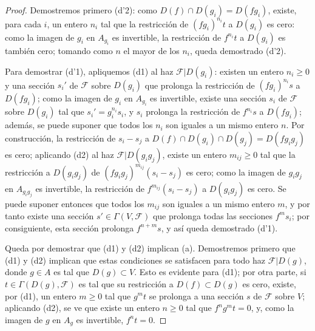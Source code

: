 \documentclass[oneside]{amsart}
\theoremstyle{ega-env-style}
\theoremstyle{ega-thm-env-style}
\theoremstyle{ega-defn-env-style}
\def\geq{\geqslant}                 %
\newcommand{\oldpage}[2][]{{\marginnote{\normalfont{\textbf{#1}~|~#2}}}\ignorespaces}
\begin{document}
\begin{proof}
Demostremos primero (d'2): como $D(f)\cap D(g_i)=D(fg_i)$, existe, para cada $i$, un entero $n_i$ tal que la restricción de $(fg_i)^{n_i}t$ a $D(g_i)$ es cero:
como la imagen de $g_i$ en $A_{g_i}$ es invertible, la restricción de $f^{n_i}t$ a $D(g_i)$ es también cero;
tomando como $n$ el mayor de los $n_i$, queda demostrado (d'2).

Para demostrar (d'1), apliquemos (d1) al haz $\mathscr{F}|D(g_i)$: existen un entero $n_i\geq0$ y una sección $s_i'$ de $\mathscr{F}$ sobre $D(g_i)$ que prolonga la restricción de $(fg_i)^{n_i}s$ a $D(fg_i)$;
como la imagen de $g_i$ en $A_{g_i}$ es invertible, existe una sección $s_i$ de $\mathscr{F}$ sobre $D(g_i)$ tal que $s_i'=g_i^{n_i}s_i$, y $s_i$ prolonga la
restricción de $f^{n_i}s$ a $D(fg_i)$;
además, se puede suponer que todos los $n_i$ son iguales a un mismo entero $n$.
Por construcción, la restricción de $s_i-s_j$ a $D(f)\cap D(g_i)\cap D(g_j)=D(fg_i g_j)$ es cero;
aplicando (d2) al haz $\mathscr{F}|D(g_i g_j)$, existe un entero $m_{ij}\geq0$ tal que la restricción a $D(g_i g_j)$ de $(fg_i g_j)^{m_{ij}}(s_i-s_j)$ es cero;
como la imagen de $g_i g_j$ en $A_{g_i g_j}$ es invertible, la restricción de $f^{m_{ij}}(s_i-s_j)$ a $D(g_i g_j)$ es cero.
Se puede suponer entonces que todos los $m_{ij}$ son iguales a un mismo entero $m$, y por tanto existe una sección $s'\in\Gamma(V,\mathscr{F})$ que prolonga todas las secciones $f^m s_i$;
por consiguiente, esta sección prolonga $f^{n+m}s$, y así queda demostrado (d'1).

Queda por demostrar que (d1) y (d2) implican (a).
Demostremos primero que (d1) y (d2) implican que estas condiciones se satisfacen para todo haz $\mathscr{F}|D(g)$, donde $g\in A$ es tal que $D(g)\subset V$.
Esto es evidente para (d1);
por otra parte, si $t\in\Gamma(D(g),\mathscr{F})$ es tal que su restricción a $D(f)\subset D(g)$ es cero, existe, por (d1), un entero $m\geq0$ tal que $g^m t$
\oldpage[I]{92}
se prolonga a una sección $s$ de $\mathscr{F}$ sobre $V$;
aplicando (d2), se ve que existe un entero $n\geq0$ tal que $f^n g^m t=0$, y, como la imagen de $g$ en $A_g$ es invertible, $f^n t=0$.


\end{proof}
\end{document}
